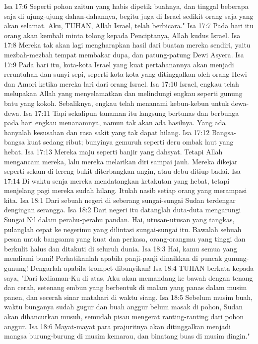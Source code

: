 Isa 17:6  Seperti pohon zaitun yang habis dipetik buahnya, dan tinggal beberapa saja di ujung-ujung dahan-dahannya, begitu juga di Israel sedikit orang saja yang akan selamat. Aku, TUHAN, Allah Israel, telah berbicara."
Isa 17:7  Pada hari itu orang akan kembali minta tolong kepada Penciptanya, Allah kudus Israel.
Isa 17:8  Mereka tak akan lagi mengharapkan hasil dari buatan mereka sendiri, yaitu mezbah-mezbah tempat membakar dupa, dan patung-patung Dewi Asyera.
Isa 17:9  Pada hari itu, kota-kota Israel yang kuat pertahanannya akan menjadi reruntuhan dan sunyi sepi, seperti kota-kota yang ditinggalkan oleh orang Hewi dan Amori ketika mereka lari dari orang Israel.
Isa 17:10  Israel, engkau telah melupakan Allah yang menyelamatkan dan melindungi engkau seperti gunung batu yang kokoh. Sebaliknya, engkau telah menanami kebun-kebun untuk dewa-dewa.
Isa 17:11  Tapi sekalipun tanaman itu langsung bertunas dan berbunga pada hari engkau menanamnya, namun tak akan ada hasilnya. Yang ada hanyalah kesusahan dan rasa sakit yang tak dapat hilang.
Isa 17:12  Bangsa-bangsa kuat sedang ribut; bunyinya gemuruh seperti deru ombak laut yang hebat.
Isa 17:13  Mereka maju seperti banjir yang dahsyat. Tetapi Allah mengancam mereka, lalu mereka melarikan diri sampai jauh. Mereka dikejar seperti sekam di lereng bukit diterbangkan angin, atau debu ditiup badai.
Isa 17:14  Di waktu senja mereka mendatangkan ketakutan yang hebat, tetapi menjelang pagi mereka sudah hilang. Itulah nasib setiap orang yang merampasi kita.
Isa 18:1  Dari sebuah negeri di seberang sungai-sungai Sudan terdengar dengingan serangga.
Isa 18:2  Dari negeri itu datanglah duta-duta mengarungi Sungai Nil dalam perahu-perahu pandan. Hai, utusan-utusan yang tangkas, pulanglah cepat ke negerimu yang dilintasi sungai-sungai itu. Bawalah sebuah pesan untuk bangsamu yang kuat dan perkasa, orang-orangmu yang tinggi dan berkulit halus dan ditakuti di seluruh dunia.
Isa 18:3  Hai, kamu semua yang mendiami bumi! Perhatikanlah apabila panji-panji dinaikkan di puncak gunung-gunung! Dengarlah apabila trompet dibunyikan!
Isa 18:4  TUHAN berkata kepada saya, "Dari kediaman-Ku di atas, Aku akan memandang ke bawah dengan tenang dan cerah, setenang embun yang berbentuk di malam yang panas dalam musim panen, dan secerah sinar matahari di waktu siang.
Isa 18:5  Sebelum musim buah, waktu bunganya sudah gugur dan buah anggur belum masak di pohon, Sudan akan dihancurkan musuh, semudah pisau mengerat ranting-ranting dari pohon anggur.
Isa 18:6  Mayat-mayat para prajuritnya akan ditinggalkan menjadi mangsa burung-burung di musim kemarau, dan binatang buas di musim dingin."
